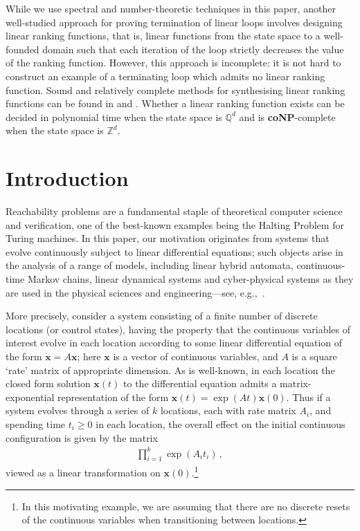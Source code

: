 While we use spectral and number-theoretic techniques in this paper,
another well-studied approach for proving termination of linear loops
involves designing linear ranking functions, that is, linear functions
from the state space to a well-founded domain such that each iteration
of the loop strictly decreases the value of the ranking
function. However, this approach is incomplete: it is not hard to
construct an example of a terminating loop which admits no linear
ranking function.  Sound and relatively complete methods for
synthesising linear ranking functions can be found in
\cite{PodelskiR04} and \cite{Ben-AmramG13}. Whether a linear
ranking function exists can be decided in polynomial time when the
state space is $\mathbb{Q}^d$ and is \textbf{coNP}-complete when the
state space is $\mathbb{Z}^d$.


\section{Introduction}

Reachability problems are a fundamental staple of theoretical computer
science and verification, one of the best-known examples being the
Halting Problem for Turing machines. In this paper, our motivation
originates from systems that evolve continuously subject to linear
differential equations; such objects arise in the analysis of a range
of models, including linear hybrid automata, continuous-time Markov
chains, linear dynamical systems and cyber-physical systems as they
are used in the physical sciences and engineering---see,
e.g.,~\cite{Alu15}.

More precisely, consider a system consisting of a finite number of
discrete locations (or control states), having the property that the
continuous variables of interest evolve in each location according to
some linear differential equation of the form $\dot{\boldsymbol{x}} = A
\boldsymbol{x}$; here $\boldsymbol{x}$ is a vector of continuous
variables, and $A$ is a square `rate' matrix of appropriate
dimension. As is well-known, in each location the closed form solution
$\boldsymbol{x}(t)$ to the differential equation admits a
matrix-exponential representation of the form $\boldsymbol{x}(t) =
\exp(At)\boldsymbol{x}(0)$. Thus if a system evolves through a series
of $k$ locations, each with rate matrix $A_i$, and spending time $t_i
\geq 0$ in each location, the overall effect on the initial continuous
configuration is given by the matrix
\begin{align*}
\prod \limits_{i=1}^{k} \exp(A_{i} t_{i}) \, ,
\end{align*}
viewed as a linear transformation on $\boldsymbol{x}(0)$.\footnote{In
  this motivating example, we are assuming that there are no discrete
  resets of the continuous variables when transitioning between
  locations.}

